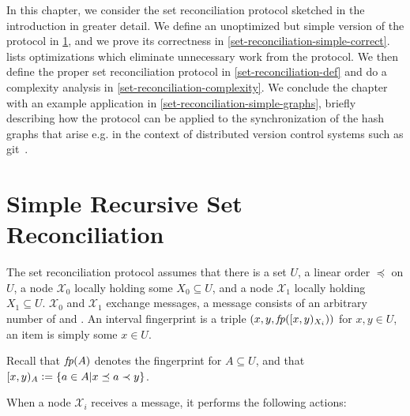 
In this chapter, we consider the set reconciliation protocol sketched in the introduction in greater detail.
We define an unoptimized but simple version of the protocol in \cref{set-reconciliation-simple-def}, and we prove its correctness in \cref{set-reconciliation-simple-correct}.  lists optimizations which eliminate unnecessary work from the protocol. We then define the proper set reconciliation protocol in \cref{set-reconciliation-def} and  do a complexity analysis in \cref{set-reconciliation-complexity}. We conclude the chapter with an example application in \cref{set-reconciliation-simple-graphs}, briefly describing how the protocol can be applied to the synchronization of the hash graphs that arise e.g. in the context of distributed version control systems such as git~\cite{chacon2014pro}.

\section{Simple Recursive Set Reconciliation}
\label{set-reconciliation-simple-def}

The set reconciliation protocol assumes that there is a set $U$, a linear order $\preceq$ on $U$, a node $\mathcal{X}_0$ locally holding some $X_0 \subseteq U$, and a node $\mathcal{X}_1$ locally holding $X_1 \subseteq U$.
$\mathcal{X}_0$ and $\mathcal{X}_1$ exchange messages, a message consists of an arbitrary number of  and .
An interval fingerprint is a triple $({x}, {y}, {\mathit{fp}([{x},{y})_{X_i})})$ for $x, y \in U$, an item is simply some $x \in U$.

Recall that $\mathit{fp}(A)$ denotes the fingerprint for $A \subseteq U$, and that $[{x},{y})_{A} \vcentcolon= \{a \in A | x \preceq a \prec y\}$.

When a node $\mathcal{X}_i$ receives a message, it performs the following actions:

